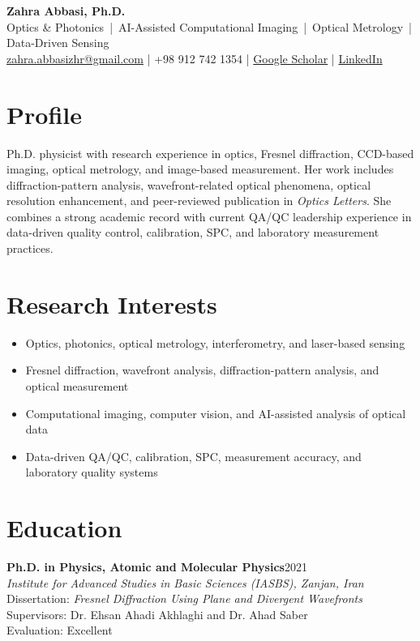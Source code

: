 \documentclass[11pt,a4paper]{article}
\newcommand{\entry}[4]{%
  \textbf{#1}\hfill {\color{light}#2}\\
  \textit{#3}\\[-1pt]
  #4\vspace{3pt}
}
\begin{document}
\begin{center}
{\Huge \textbf{Zahra Abbasi, Ph.D.}}\\[-1pt]
{Optics \& Photonics \,|\, AI-Assisted Computational Imaging \,|\, Optical Metrology \,|\, Data-Driven Sensing}\\[3pt]
\href{mailto:zahra.abbasizhr@gmail.com}{zahra.abbasizhr@gmail.com} \quad | \quad
+98 912 742 1354 \quad | \quad
\href{https://scholar.google.ca/citations?user=mczxjv4AAAAJ}{Google Scholar} \quad | \quad
\href{https://www.linkedin.com/in/abbasizhr/}{LinkedIn}
\end{center}

\section*{Profile}
Ph.D. physicist with research experience in optics, Fresnel diffraction, CCD-based imaging, optical metrology, and image-based measurement. Her work includes diffraction-pattern analysis, wavefront-related optical phenomena, optical resolution enhancement, and peer-reviewed publication in \textit{Optics Letters}. She combines a strong academic record with current QA/QC leadership experience in data-driven quality control, calibration, SPC, and laboratory measurement practices.

\section*{Research Interests}
\begin{itemize}
  \item Optics, photonics, optical metrology, interferometry, and laser-based sensing
  \item Fresnel diffraction, wavefront analysis, diffraction-pattern analysis, and optical measurement
  \item Computational imaging, computer vision, and AI-assisted analysis of optical data
  \item Data-driven QA/QC, calibration, SPC, measurement accuracy, and laboratory quality systems
\end{itemize}

\section*{Education}

\entry{Ph.D. in Physics, Atomic and Molecular Physics}{2021}
{Institute for Advanced Studies in Basic Sciences (IASBS), Zanjan, Iran}
{
Dissertation: \textit{Fresnel Diffraction Using Plane and Divergent Wavefronts}\\
Supervisors: Dr. Ehsan Ahadi Akhlaghi and Dr. Ahad Saber\\
Evaluation: Excellent
}
\end{document}
